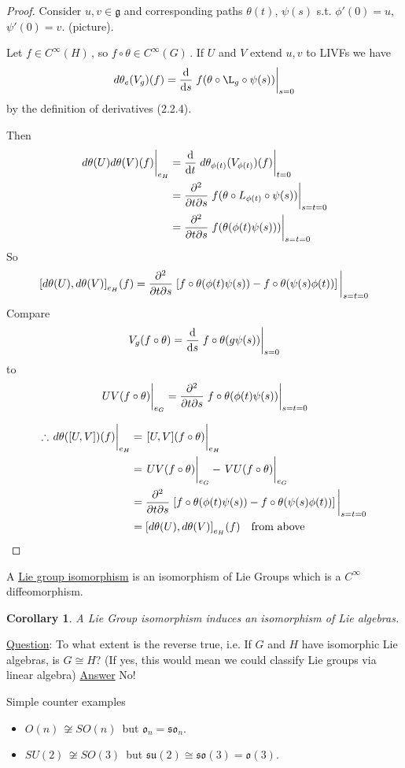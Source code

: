 \documentclass[12pt,a4paper]{article}
\newcommand{\cinf}{\ensuremath{C^{\infty}\,}}
\newcommand{\cinfn}[1]{\ensuremath{C^{\infty}(#1)\,}}
\newcommand{\dgq}[2]{\ensuremath{d {#1}_{#2}}}
\newcommand{\dg}[1]{\ensuremath{d {#1}}}
\newcommand{\gon}{\ensuremath{O(n)\,}}
\newcommand{\gson}{\ensuremath{SO(n)\,}}
\newcommand{\gsok}[1]{\ensuremath{SO(#1)\,}}
\newcommand{\gsuk}[1]{\ensuremath{SU(#1)\,}}
\newcommand{\lgon}{\ensuremath{\mathfrak{o}_n}}
\newcommand{\lgson}{\ensuremath{\mathfrak{so}_n}}
\newcommand{\ul}[1]{\underline{#1}}
\newcommand{\commp}[3]{\ensuremath{\comm{#1}{#2}}_{#3}}
\newtheorem{cor}[thm]{Corollary}
\begin{document}
\begin{proof}
Consider $u,v \in \mathfrak{g}$ and corresponding paths $\theta(t)$, $\psi(s)$ s.t. $\phi'(0)=u$, $\psi'(0)=v$. (picture).

Let $f\in \cinfn{H}$, so $f\circ \theta \in \cinfn{G}$. If $U$ and $V$ extend $u,v$ to LIVFs we have 
\[\dgq{\theta}{e} (V_g) (f) = \dv{s} \eval{f(\theta \circ \L_g \circ \psi(s))}_{s=0}\] 
by the definition of derivatives (2.2.4).

Then 
\begin{align*}
\eval{\dg{\theta}(U) \dg{\theta}(V) (f)}_{e_H}&=\dv{t}\eval{\dgq{\theta}{\phi(t)} (V_{\phi(t)}) (f)}_{t=0}\\
&=\pdv{}{t}{s}\eval{f(\theta\circ L_{\phi(t)}\circ \psi(s))}_{s=t=0}\\
&=\pdv{}{t}{s}\eval{f(\theta(\phi(t)\psi(s)))}_{s=t=0}
\end{align*}
So 
\[\commp{\dg{\theta}(U)}{\dg{\theta}(V)}{e_H}(f)=\pdv{}{t}{s}\eval{\left[f\circ\theta(\phi(t)\psi(s))-f\circ\theta(\psi(s)\phi(t))\right]}_{s=t=0}\]
Compare 
\[V_g(f\circ\theta)=\dv{s}\eval{f\circ\theta(g\psi(s))}_{s=0}\]
to 
\[\eval{UV(f\circ\theta)}_{e_G}=\pdv{}{t}{s}\eval{f\circ\theta(\phi(t)\psi(s))}_{s=t=0}\]

\begin{align*}
\therefore \eval{\dg{\theta}(\comm{U}{V})(f)}_{e_H} &=\eval{\comm{U}{V}(f\circ\theta)}_{e_H} \\
&= \eval{UV(f\circ\theta)}_{e_G}-\eval{VU(f\circ\theta)}_{e_G}\\
&= \pdv{}{t}{s}\eval{\left[f\circ\theta(\phi(t)\psi(s))-f\circ\theta(\psi(s)\phi(t))\right]}_{s=t=0}\\
&= \commp{\dg{\theta}(U)}{\dg{\theta}(V)}{e_H}(f) \quad \text{from above}
\end{align*}
\end{proof}

A \ul{Lie group isomorphism} is an isomorphism of Lie Groups which is a $\cinf$ diffeomorphism. 

\begin{cor}
A Lie Group isomorphism induces an isomorphism of Lie algebras.
\end{cor}

\ul{Question}: To what extent is the reverse true, i.e. If $G$ and $H$ have isomorphic Lie algebras, is $G \cong H$?
(If yes, this would mean we could classify Lie groups via linear algebra)
\ul{Answer} No!

Simple counter examples 
\begin{itemize}
\item $\gon \not \cong \gson$ but $\lgon =\lgson$.
\item $\gsuk{2}\not \cong \gsok{3}$ but $\mathfrak{su}(2) \cong \mathfrak{so}(3) = \mathfrak{o}(3)$.
\end{itemize}
\end{document}
